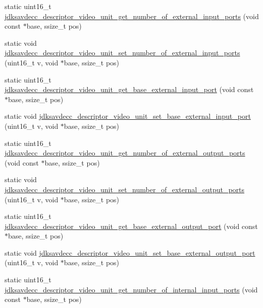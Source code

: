 \begin{DoxyCompactItemize}
static uint16\+\_\+t \hyperlink{group__descriptor__video_ga6b04c0b6235d68677dd86d4f367a9ea9}{jdksavdecc\+\_\+descriptor\+\_\+video\+\_\+unit\+\_\+get\+\_\+number\+\_\+of\+\_\+external\+\_\+input\+\_\+ports} (void const $\ast$base, ssize\+\_\+t pos)
\item 
static void \hyperlink{group__descriptor__video_gab8314a46c6a109ac5d01ae5dde43bf85}{jdksavdecc\+\_\+descriptor\+\_\+video\+\_\+unit\+\_\+set\+\_\+number\+\_\+of\+\_\+external\+\_\+input\+\_\+ports} (uint16\+\_\+t v, void $\ast$base, ssize\+\_\+t pos)
\item 
static uint16\+\_\+t \hyperlink{group__descriptor__video_ga196034a3f6b4470ec4accc3e5d9277c4}{jdksavdecc\+\_\+descriptor\+\_\+video\+\_\+unit\+\_\+get\+\_\+base\+\_\+external\+\_\+input\+\_\+port} (void const $\ast$base, ssize\+\_\+t pos)
\item 
static void \hyperlink{group__descriptor__video_ga605527196ab0327ebfd39f5c88c9bd66}{jdksavdecc\+\_\+descriptor\+\_\+video\+\_\+unit\+\_\+set\+\_\+base\+\_\+external\+\_\+input\+\_\+port} (uint16\+\_\+t v, void $\ast$base, ssize\+\_\+t pos)
\item 
static uint16\+\_\+t \hyperlink{group__descriptor__video_ga26509d66efd0bb690f4c4202c5d63e13}{jdksavdecc\+\_\+descriptor\+\_\+video\+\_\+unit\+\_\+get\+\_\+number\+\_\+of\+\_\+external\+\_\+output\+\_\+ports} (void const $\ast$base, ssize\+\_\+t pos)
\item 
static void \hyperlink{group__descriptor__video_ga81d988f00d6518078981013f3d9f5492}{jdksavdecc\+\_\+descriptor\+\_\+video\+\_\+unit\+\_\+set\+\_\+number\+\_\+of\+\_\+external\+\_\+output\+\_\+ports} (uint16\+\_\+t v, void $\ast$base, ssize\+\_\+t pos)
\item 
static uint16\+\_\+t \hyperlink{group__descriptor__video_ga4fbc461f3562c8da5614197e9ef3e822}{jdksavdecc\+\_\+descriptor\+\_\+video\+\_\+unit\+\_\+get\+\_\+base\+\_\+external\+\_\+output\+\_\+port} (void const $\ast$base, ssize\+\_\+t pos)
\item 
static void \hyperlink{group__descriptor__video_ga45869bc92e896678bcdb4510680ad1d7}{jdksavdecc\+\_\+descriptor\+\_\+video\+\_\+unit\+\_\+set\+\_\+base\+\_\+external\+\_\+output\+\_\+port} (uint16\+\_\+t v, void $\ast$base, ssize\+\_\+t pos)
\item 
static uint16\+\_\+t \hyperlink{group__descriptor__video_gaaad221b2d6773196c2084dd54d58abdd}{jdksavdecc\+\_\+descriptor\+\_\+video\+\_\+unit\+\_\+get\+\_\+number\+\_\+of\+\_\+internal\+\_\+input\+\_\+ports} (void const $\ast$base, ssize\+\_\+t pos)
\item 

\end{DoxyCompactItemize}
